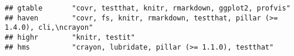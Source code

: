 \documentclass[]{book}
\begin{document}
\begin{verbatim}
## gtable       "covr, testthat, knitr, rmarkdown, ggplot2, profvis"                                                                                                                                                                                                                                                                                                                                                                                                                                                                                                                                                                                                                                                      
## haven        "covr, fs, knitr, rmarkdown, testthat, pillar (>= 1.4.0), cli,\ncrayon"                                                                                                                                                                                                                                                                                                                                                                                                                                                                                                                                                                                                                                   
## highr        "knitr, testit"                                                                                                                                                                                                                                                                                                                                                                                                                                                                                                                                                                                                                                                                                           
## hms          "crayon, lubridate, pillar (>= 1.1.0), testthat"                                                                                                                                                                                                                                                                                                                                                                                                                                                                                                                                                                                                                                                          

\end{verbatim}
\end{document}
